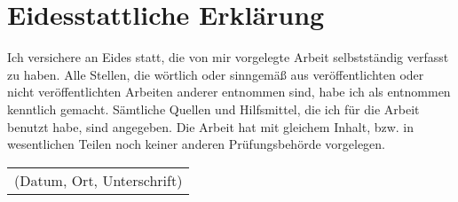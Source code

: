 \section*{Eidesstattliche Erklärung}
Ich versichere an Eides statt, die von mir vorgelegte Arbeit selbstständig verfasst zu haben. Alle Stellen, die wörtlich oder sinngemäß aus veröffentlichten oder nicht veröffentlichten Arbeiten anderer entnommen sind, habe ich als entnommen kenntlich gemacht. Sämtliche Quellen und Hilfsmittel, die ich für die Arbeit benutzt habe, sind angegeben. Die Arbeit hat mit gleichem Inhalt, bzw. in wesentlichen Teilen noch keiner anderen Prüfungsbehörde vorgelegen.

\vspace{5cm}

\begin{table}[H]
\begin{tabular}{l}
\cline{1-1}
\rule{0pt}{4ex}   
(Datum, Ort, Unterschrift) \hspace{8cm}
\end{tabular}
\end{table}